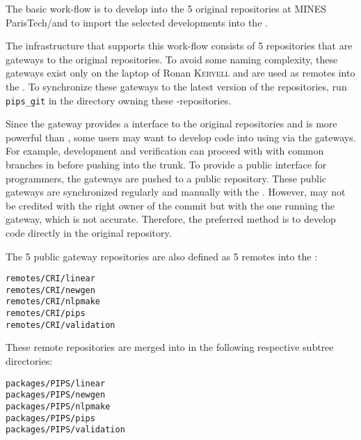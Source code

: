 \documentclass[a4paper]{article}
\begin{document}
The basic \Apips work-flow is to develop into the 5 original \Apips{}
\Asvn repositories at MINES ParisTech/\Acri and to import the selected
developments into the \Apfa{} \Agit.

The infrastructure that supports this work-flow consists of 5 \Agit
repositories that are
gateways to the original \Asvn
repositories. To avoid some naming complexity, these gateways exist only on the laptop
of Ronan \textsc{Keryell} and are used as remotes into
the \Apfa{} \Agit. To synchronize these gateways to the latest version of
the \Apips{} \Asvn repositories, run \verb|pips_git| in the directory
owning these \Agit-\Asvn repositories.

Since the gateway provides a \Agit interface to the original \Apips{} \Asvn
repositories and \Agit is more powerful than \Asvn, some users may
want to develop code into \Apips using \Agit via the gateways. For
example, development and verification can proceed with with common
branches in \Agit before pushing into the \Apips{} \Asvn trunk. To provide
a public interface for programmers, the \Agit gateways are pushed to a public
\Agit repository. These public gateways are synchronized regularly and
manually with the \Apips{} \Asvn. However,
\Asvn may not be credited with the right owner of the commit but with the
one running the gateway, which is not accurate. Therefore, the
preferred method is to
develop code directly in the original \Apips \Asvn repository.

The 5 public gateway \Agit repositories are also defined as 5 remotes into
the \Apfa{} \Agit:
\begin{description}
\item[\texttt{remotes/CRI/linear}]
\item[\texttt{remotes/CRI/newgen}]
\item[\texttt{remotes/CRI/nlpmake}]
\item[\texttt{remotes/CRI/pips}]
\item[\texttt{remotes/CRI/validation}]
\end{description}

These remote repositories are merged into \Apfa in the following
respective subtree directories:
\begin{description}
\item[\texttt{packages/PIPS/linear}]
\item[\texttt{packages/PIPS/newgen}]
\item[\texttt{packages/PIPS/nlpmake}]
\item[\texttt{packages/PIPS/pips}]
\item[\texttt{packages/PIPS/validation}]
\end{description}
\end{document}
